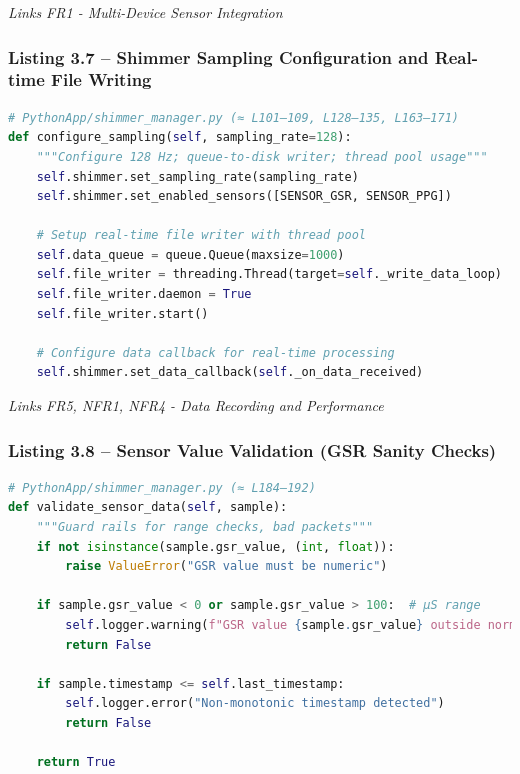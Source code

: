 \documentclass[12pt,a4paper]{article}
\begin{document}
\emph{Links FR1 - Multi-Device Sensor Integration}

\subsubsection{Listing 3.7 -- Shimmer Sampling Configuration and Real-time File Writing}\label{listing-3.7-shimmer-sampling-configuration-and-real-time-file-writing}

\begin{lstlisting}[language=Python]
# PythonApp/shimmer_manager.py (≈ L101–109, L128–135, L163–171)
def configure_sampling(self, sampling_rate=128):
    """Configure 128 Hz; queue-to-disk writer; thread pool usage"""
    self.shimmer.set_sampling_rate(sampling_rate)
    self.shimmer.set_enabled_sensors([SENSOR_GSR, SENSOR_PPG])
    
    # Setup real-time file writer with thread pool
    self.data_queue = queue.Queue(maxsize=1000)
    self.file_writer = threading.Thread(target=self._write_data_loop)
    self.file_writer.daemon = True
    self.file_writer.start()
    
    # Configure data callback for real-time processing
    self.shimmer.set_data_callback(self._on_data_received)
\end{lstlisting}

\emph{Links FR5, NFR1, NFR4 - Data Recording and Performance}

\subsubsection{Listing 3.8 -- Sensor Value Validation (GSR Sanity Checks)}\label{listing-3.8-sensor-value-validation-gsr-sanity-checks}

\begin{lstlisting}[language=Python]
# PythonApp/shimmer_manager.py (≈ L184–192)
def validate_sensor_data(self, sample):
    """Guard rails for range checks, bad packets"""
    if not isinstance(sample.gsr_value, (int, float)):
        raise ValueError("GSR value must be numeric")
    
    if sample.gsr_value < 0 or sample.gsr_value > 100:  # μS range
        self.logger.warning(f"GSR value {sample.gsr_value} outside normal range")
        return False
    
    if sample.timestamp <= self.last_timestamp:
        self.logger.error("Non-monotonic timestamp detected")
        return False
    
    return True
\end{lstlisting}
\end{document}
